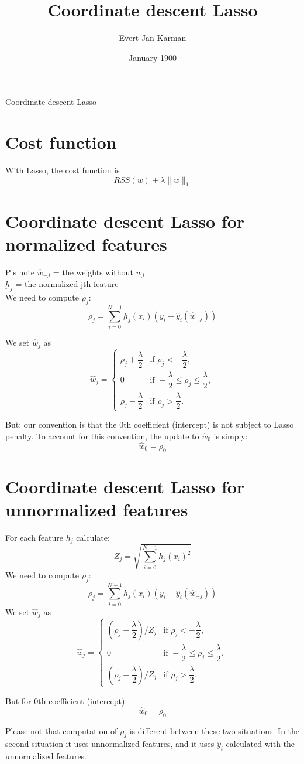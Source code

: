 \documentclass[12pt, letterpaper]{article}
\title{Coordinate descent Lasso}
\author{Evert Jan Karman}
\date{January 1900}
\begin{document}
\maketitle

Coordinate descent Lasso

\section{Cost function}
With Lasso, the cost function is
\[
RSS(w) + \lambda \lVert w \rVert_1
\]

\section{Coordinate descent Lasso for normalized features}
Pls note
$\hat{w}_{-j}$ = the weights without $w_j$\\
$\underbar{h}_{j}$ = the normalized jth feature\\

We need to compute $\rho_j$:
\[
\rho_j = \sum_{i=0}^{N-1} \underbar{h}_{j}(x_{i}) (y_i - \hat{y}_i (\hat{w}_{-j}))
\]

We set $\hat{w}_j$ as
\[
\hat{w}_j =
\begin{cases}
\rho_j + \dfrac{\lambda}{2} & \text{if } \rho_j < -\dfrac{\lambda}{2},\\
0 & \text{if } -\dfrac{\lambda}{2} \le \rho_j \le \dfrac{\lambda}{2},\\
\rho_j - \dfrac{\lambda}{2} & \text{if } \rho_j > \dfrac{\lambda}{2}.
\end{cases}
\]

But: our convention is that the 0th coefficient (intercept) is not subject to Lasso penalty.
To account for this convention, the update to $\hat{w}_0$ is simply:
\[
\hat{w}_0 = \rho_0
\]

\section{Coordinate descent Lasso for unnormalized features}
For each feature $h_{j}$ calculate:
\[
Z_{j} = \sqrt{\sum_{i=0}^{N-1} h_{j}(x_{i})^{2}}
\]
We need to compute $\rho_j$:
\[
\rho_j = \sum_{i=0}^{N-1} h_{j}(x_{i}) (y_i - \hat{y}_i (\hat{w}_{-j}))
\]
We set $\hat{w}_j$ as
\[
\hat{w}_j =
\begin{cases}
(\rho_j + \dfrac{\lambda}{2}) / Z_{j} & \text{if } \rho_j < -\dfrac{\lambda}{2},\\
0 & \text{if } -\dfrac{\lambda}{2} \le \rho_j \le \dfrac{\lambda}{2},\\
(\rho_j - \dfrac{\lambda}{2}) / Z_{j} & \text{if } \rho_j > \dfrac{\lambda}{2}.
\end{cases}
\]

But for 0th coefficient (intercept):
\[
\hat{w}_0 = \rho_0
\]


Please not that computation of $\rho_j$ is different between these two situations.
In the second situation it uses unnormalized features,
and it uses $\hat{y}_i$ calculated with the unnormalized features.
\end{document}
